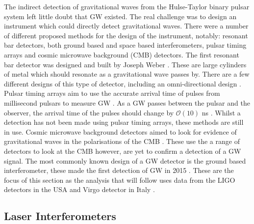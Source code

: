 The indirect detection of gravitational waves from the Hulse-Taylor binary pulsar system left little doubt that \gls{GW} existed. 
The real challenge was to design an instrument which could directly detect gravitational waves.
There were a number of different proposed methods for the design of the instrument, notably: resonant bar detectors, both ground based and space based interferometers, pulsar timing arrays and cosmic microwave background (CMB) detectors. 
The first resonant bar detector was designed and built by Joseph Weber \citep{weber1966ObservationThermal}. 
These are large cylinders of metal which should resonate as a gravitational wave passes by. 
There are a few different designs of this type of detector, including an omni-directional design \citep{dewaard2003MiniGRAILFirst}. 
Pulsar timing arrays aim to use the accurate arrival time of pulses from millisecond pulsars to measure \gls{GW} \citep{hobbs2017GravitationalWave}. As a \gls{GW} passes between the pulsar and the observer, the arrival time of the pulses should change by $\mathcal{O}(10)$ ns \citep{hobbs2017GravitationalWave}. 
Whilst a detection has not been made using pulsar timing arrays, these methods are still in use.
Cosmic microwave background detectors aimed to look for evidence of gravitational waves in the polarisations of the CMB \citep{ade2018ConstraintsPrimordial}.  
These use the a range of detectors to look at the CMB however, are yet to confirm a detection of a \gls{GW} signal.
The most commonly known design of a \gls{GW} detector is the ground based interferometer, these made the first detection of \gls{GW} in 2015 \citep{abbott2016ObservationGravitational}. 
These are the focus of this section as the analysis that will follow uses data from the \gls{LIGO} detectors in the USA \citep{abbott2009LIGOLaser,aasi2015AdvancedLIGO} and Virgo detector in Italy \citep{acernese2015AdvancedVirgo,acernese2008StatusVirgo}. 

\subsection{Laser Interferometers}

